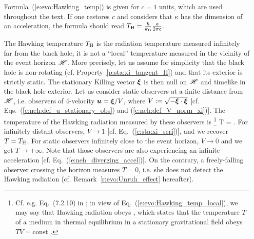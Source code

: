 \begin{remark}\label{r:evo:Hawking_temp_units}
Formula~(\ref{e:evo:Hawking_temp}) is given for $c=1$
units, which are used throughout the text. If one restores $c$ and considers
that $\kappa$ has the dimension of an acceleration, the formula should read
$T_{\rm H} = \frac{\hbar}{k_{\rm B}} \frac{\kappa}{2\pi c}$.
\end{remark}

\begin{remark}\label{r:evo:local_Hawking_rad}
The Hawking temperature $T_{\rm H}$ is the radiation temperature measured
infinitely far from the black hole; it is not a ``local'' temperature
measured in the vicinity of the event horizon $\mathscr{H}$.
More precisely, let us assume for simplicity that the black hole is non-rotating
(cf. Property~\ref{p:sta:xi_tangent_H}) and that its exterior is strictly static.
The stationary Killing vector $\bm{\xi}$ is then null on $\mathscr{H}$  and
timelike in the black hole exterior. Let us consider static observers at a finite distance
from $\mathscr{H}$, i.e. observers
of 4-velocity $\bm{u} = \bm{\xi} / V$, where $V := \sqrt{-\bm{\xi}\cdot\bm{\xi}}$
[cf. Eqs.~(\ref{e:neh:def_u_stationary_obs}) and (\ref{e:neh:def_V_norm_xi})].
The temperature of the Hawking radiation measured by these observers is
\footnote{Cf. e.g. Eq.~(7.2.10) in \cite{Wald94}; in view of Eq.~(\ref{e:evo:Hawking_temp_local}), we may say
that Hawking radiation obeys , which
states that the temperature $T$ of a medium in thermal equilibrium in a stationary gravitational field
obeys $T V = \mathrm{const}$ \cite{SantiV19}.}
\be \label{e:evo:Hawking_temp_local}
    T =  .
\ee
For infinitely distant observers, $V\to 1$ [cf. Eq.~(\ref{e:sta:xi_scri})], and we recover $T=T_{\rm H}$.
For static observers infinitely close to the event horizon, $V\to 0$ and we get
$T\to +\infty$. Note that those observers are
also experiencing an infinite acceleration [cf. Eq.~(\ref{e:neh_diverging_accel})].
On the contrary, a freely-falling observer crossing the horizon measures
$T=0$, i.e. she does not detect the Hawking radiation (cf. Remark~\ref{r:evo:Unruh_effect} hereafter).
\end{remark}

